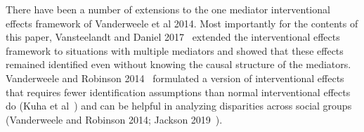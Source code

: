 \documentclass[11pt]{article} %
\numberwithin{equation}{section} %
\begin{document}
There have been a number of extensions to the one mediator interventional effects framework of Vanderweele et al 2014. Most importantly for the contents of this paper, Vansteelandt and Daniel 2017~\citep{vansteelandtdaniel2017} extended the interventional effects framework to situations with multiple mediators and showed that these effects remained identified even without knowing the causal structure of the mediators. Vanderweele and Robinson 2014~\citep{vanderweelerobinson2014} formulated a version of interventional effects that requires fewer identification assumptions than normal interventional effects do (Kuha et al~\citep{kuhaetal2021}) and can be helpful in analyzing disparities across social groups (Vanderweele and Robinson 2014; Jackson 2019~\citep{jackson2019}). 




\end{document}
